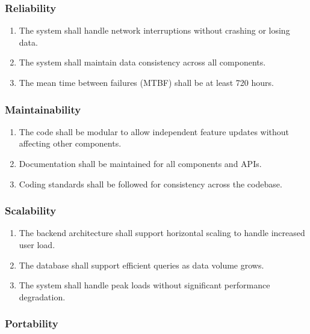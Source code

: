 \documentclass[12pt,a4paper]{article}
\begin{document}
\subsubsection{Reliability}

\begin{enumerate}[leftmargin=*, label=\textbf{RE-\arabic*.}, itemsep=4pt]
  \item The system shall handle network interruptions without crashing or losing data.
  \item The system shall maintain data consistency across all components.
  \item The mean time between failures (MTBF) shall be at least 720 hours.
\end{enumerate}

\subsubsection{Maintainability}

\begin{enumerate}[leftmargin=*, label=\textbf{MA-\arabic*.}, itemsep=4pt]
  \item The code shall be modular to allow independent feature updates without affecting other components.
  \item Documentation shall be maintained for all components and APIs.
  \item Coding standards shall be followed for consistency across the codebase.
\end{enumerate}

\subsubsection{Scalability}

\begin{enumerate}[leftmargin=*, label=\textbf{SC-\arabic*.}, itemsep=4pt]
  \item The backend architecture shall support horizontal scaling to handle increased user load.
  \item The database shall support efficient queries as data volume grows.
  \item The system shall handle peak loads without significant performance degradation.
\end{enumerate}

\subsubsection{Portability}
\end{document}
